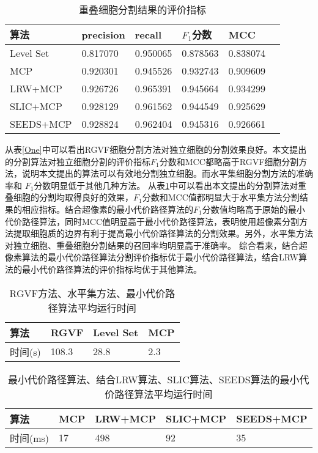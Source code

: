 \documentclass[nomlist,masters]{seuthesix}
\begin{document}
\begin{table}[H]
\centering
\caption{重叠细胞分割结果的评价指标\label{Olap}}
\begin{tabular}{|p{3cm}<{\centering}|p{2cm}<{\centering}|p{2cm}<{\centering}|p{2cm}<{\centering}|p{2cm}<{\centering}|p{2cm}<{\centering}|}
\hline
算法 & precision & recall & $F_{1}$分数 & MCC \\
\hline
Level Set & 0.817070 & 0.950065 & 0.878563 & 0.838074 \\
\hline
MCP & 0.920301 & 0.945526 & 0.932743 & 0.909609 \\
\hline
LRW+MCP & 0.926726 & 0.965391 & 0.945664 & 0.934299 \\
\hline
SLIC+MCP & 0.928129 & 0.961562 & 0.944549 & 0.925629 \\
\hline
SEEDS+MCP & 0.928824 & 0.962404 & 0.945316 & 0.926661 \\
\hline
\end{tabular}
\end{table}

从表\ref{One}中可以看出RGVF细胞分割方法对独立细胞的分割效果良好。本文提出的分割算法对独立细胞分割的评价指标$F_{1}$分数和MCC都略高于RGVF细胞分割方法，说明本文提出的算法可以有效地分割独立细胞。而水平集细胞分割方法的准确率和 $F_{1}$分数明显低于其他几种方法。
从表\ref{Olap}中可以看出本文提出的分割算法对重叠细胞的分割均取得良好的效果，$F_{1}$分数和MCC值都明显大于水平集方法分割结果的相应指标。结合超像素的最小代价路径算法的$F_{1}$分数值均略高于原始的最小代价路径算法，同时MCC值明显高于最小代价路径算法，表明使用超像素分割方法提取细胞质的边界有利于提高最小代价路径算法的分割效果。另外，水平集方法对独立细胞、重叠细胞分割结果的召回率均明显高于准确率。
综合看来，结合超像素算法的最小代价路径算法分割评价指标优于最小代价路径算法，结合LRW算法的最小代价路径算法的评价指标均优于其他算法。


\begin{table}[H]
\centering
\caption{RGVF方法、水平集方法、最小代价路径算法平均运行时间\label{timeMatlab}}
\begin{tabular}{|p{2cm}<{\centering}|p{2cm}<{\centering}|p{2cm}<{\centering}|p{2cm}<{\centering}|}
\hline
算法 & RGVF & Level Set & MCP\\
\hline
时间(s) & 108.3 & 28.8 & 2.3\\
\hline
\end{tabular}
\end{table}

\begin{table}[H]
\centering
\caption{最小代价路径算法、结合LRW算法、SLIC算法、SEEDS算法的最小代价路径算法平均运行时间\label{timeC}}
\begin{tabular}{|p{2cm}<{\centering}|p{2.5cm}<{\centering}|p{2.5cm}<{\centering}|p{2.5cm}<{\centering}|p{2.5cm}<{\centering}|}
\hline
算法 & MCP & LRW+MCP & SLIC+MCP & SEEDS+MCP\\
\hline
时间(ms) & 17 & 498 & 92 & 35\\
\hline
\end{tabular}
\end{table}
\end{document}

